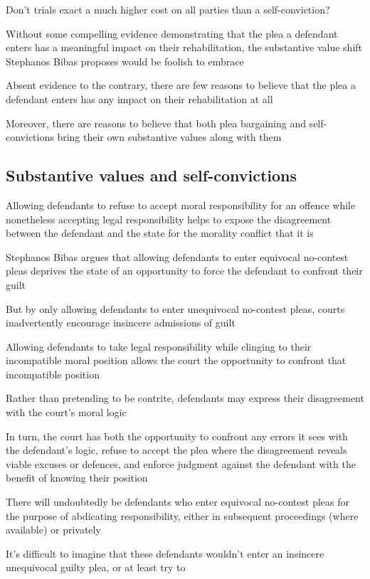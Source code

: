 Don't trials exact a much higher cost on all parties than a self-conviction?

Without some compelling evidence demonstrating that the plea a defendant enters has a meaningful impact on their rehabilitation, the substantive value shift Stephanos Bibas proposes would be foolish to embrace

Absent evidence to the contrary, there are few reasons to believe that the plea a defendant enters has any impact on their rehabilitation at all

Moreover, there are reasons to believe that both plea bargaining and self-convictions bring their own substantive values along with them

\subsection{Substantive values and self-convictions}

Allowing defendants to refuse to accept moral responsibility for an offence while nonetheless accepting legal responsibility helps to expose the disagreement between the defendant and the state for the morality conflict that it is

Stephanos Bibas argues that allowing defendants to enter equivocal no-contest pleas deprives the state of an opportunity to force the defendant to confront their guilt

But by only allowing defendants to enter unequivocal no-contest pleas, courts inadvertently encourage insincere admissions of guilt

Allowing defendants to take legal responsibility while clinging to their incompatible moral position allows the court the opportunity to confront that incompatible position

Rather than pretending to be contrite, defendants may express their disagreement with the court's moral logic

In turn, the court has both the opportunity to confront any errors it sees with the defendant's logic, refuse to accept the plea where the disagreement reveals viable excuses or defences, and enforce judgment against the defendant with the benefit of knowing their position

There will undoubtedly be defendants who enter equivocal no-contest pleas for the purpose of abdicating responsibility, either in subsequent proceedings (where available) or privately

It's difficult to imagine that these defendants wouldn't enter an insincere unequivocal guilty plea, or at least try to

